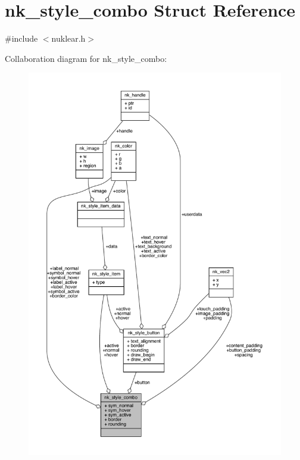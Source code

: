 \hypertarget{structnk__style__combo}{}\section{nk\+\_\+style\+\_\+combo Struct Reference}
\label{structnk__style__combo}


{\ttfamily \#include $<$nuklear.\+h$>$}



Collaboration diagram for nk\+\_\+style\+\_\+combo\+:
\nopagebreak
\begin{figure}[H]
\begin{center}
\leavevmode
\includegraphics[width=350pt]{structnk__style__combo__coll__graph}
\end{center}
\end{figure}
